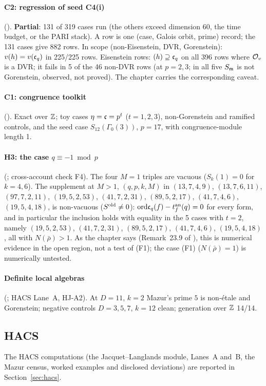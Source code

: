 \paragraph{C2: regression of seed C4(i)} (). \textbf{Partial}: 131 of 319 cases run (the others exceed
dimension 60, the time budget, or the PARI stack). A row is one (case, Galois orbit, prime) record; the 131 cases give 882 rows. In scope (non-Eisenstein, DVR, Gorenstein): $v(h)=v(\mathfrak{c}_q)$ in
225/225 rows. Eisenstein rows: $(h)\supseteq\mathfrak{c}_q$ on all 396 rows where $\mathcal{O}_v$ is a DVR; it fails in 5 of the 46 non-DVR
rows (at $p=2,3$; in all five $S_{\mathfrak{m}}$ is not Gorenstein, observed, not proved). The chapter carries the corresponding caveat.

\paragraph{C1: congruence toolkit} (). Exact over $\mathbb{Z}$; toy cases $\eta=\mathfrak{c}=p^t$ ($t=1,2,3$), non-Gorenstein
and ramified controls, and the seed case $S_{12}(\Gamma_0(3))$, $p=17$, with congruence-module length 1.

\paragraph{H3: the case $q\equiv-1\bmod p$} (; cross-account check F4). The four $M=1$ triples
are vacuous ($S_k(1)=0$ for $k=4,6$). The supplement at $M>1$, $(q,p,k,M)$ in
$(13,7,4,9)$, $(13,7,6,11)$, $(97,7,2,11)$, $(19,5,2,53)$, $(41,7,2,31)$, $(89,5,2,17)$, $(41,7,4,6)$, $(19,5,4,18)$, is non-vacuous
($S^{\rm old}\ne0$): $\mathrm{ord}\mathfrak{c}_q(f)-t^{\rm an}_f(q)=0$ for every form, and in particular the inclusion holds with equality in the
5 cases with $t=2$, namely $(19,5,2,53)$, $(41,7,2,31)$, $(89,5,2,17)$, $(41,7,4,6)$, $(19,5,4,18)$, all with $N(\bar\rho)>1$.
As the chapter says (Remark~23.9 of \mainpdf), this is numerical evidence in the open region, not a test of (F1); the case
(F1) ($N(\bar\rho)=1$) is numerically untested.

\paragraph{Definite local algebras} (; HACS Lane~A, HJ-A2). At $D=11$, $k=2$ Mazur's prime $5$ is
non-\'etale and Gorenstein; negative controls $D=3,5,7$, $k=12$ clean; generation over $\mathbb{Z}$ 14/14.

\subsection{HACS}\label{ss:hacs-pointer}
The HACS computations (the Jacquet--Langlands module, Lanes~A and~B, the Mazur census, worked examples and disclosed deviations) are reported in Section~\ref{sec:hacs}.
